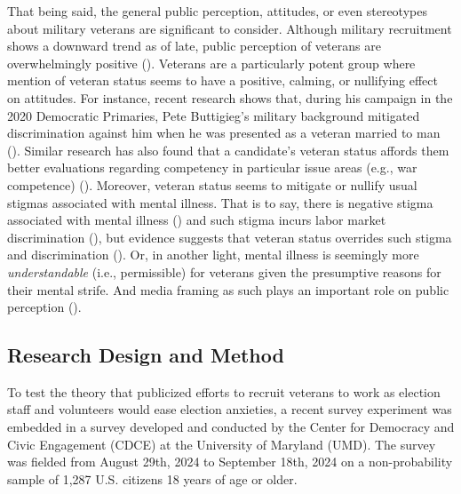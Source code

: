 \documentclass[
  11pt,
  a4paper,
]{scrartcl}
\begin{document}
That being said, the general public perception, attitudes, or even
stereotypes about military veterans are significant to consider.
Although military recruitment shows a downward trend as of late, public
perception of veterans are overwhelmingly positive
().
Veterans are a particularly potent group where mention of veteran status
seems to have a positive, calming, or nullifying effect on attitudes.
For instance, recent research shows that, during his campaign in the
2020 Democratic Primaries, Pete Buttigieg's military background
mitigated discrimination against him when he was presented as a veteran
married to man ().
Similar research has also found that a candidate's veteran status
affords them better evaluations regarding competency in particular issue
areas (e.g., war competence) (). Moreover, veteran status seems to mitigate or nullify usual
stigmas associated with mental illness. That is to say, there is
negative stigma associated with mental illness
() and such stigma
incurs labor market discrimination (), but evidence suggests that veteran status overrides such
stigma and discrimination (). Or, in another light, mental illness is seemingly more
\emph{understandable} (i.e., permissible) for veterans given the
presumptive reasons for their mental strife. And media framing as such
plays an important role on public perception
().

\subsection{Research Design and
Method}\label{research-design-and-method}

To test the theory that publicized efforts to recruit veterans to work
as election staff and volunteers would ease election anxieties, a recent
survey experiment was embedded in a survey developed and conducted by
the Center for Democracy and Civic Engagement (CDCE) at the University
of Maryland (UMD). The survey was fielded from August 29th, 2024 to
September 18th, 2024 on a non-probability sample of 1,287 U.S. citizens
18 years of age or older.
\end{document}
